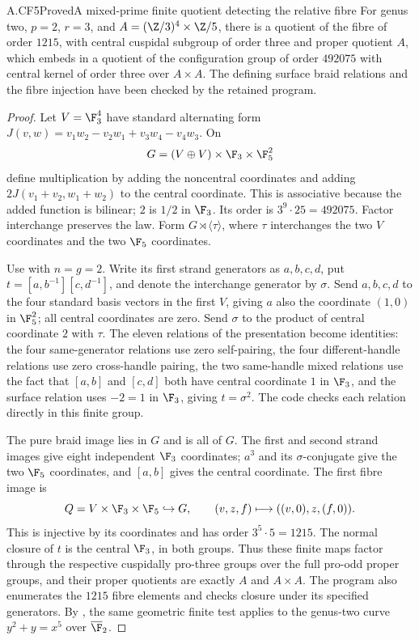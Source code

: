 \begin{claim}{A.CF5}{Proved}{A mixed-prime finite quotient detecting the relative fibre}
For genus two, $p=2$, $r=3$, and
$A=(\Z/3)^4\times\Z/5$, there is a quotient of the fibre of
order $1215$, with central cuspidal subgroup of order three and proper
quotient $A$, which embeds in a quotient of the configuration group of
order $492075$ with central kernel of order three over $A\times A$.
The defining surface braid relations and the fibre injection have been
checked by the retained program.
\end{claim}
\begin{proof}
Let $V=\F_3^4$ have standard alternating form
$J(v,w)=v_1w_2-v_2w_1+v_3w_4-v_4w_3$. On
\[
 G=(V\oplus V)\times\F_3\times\F_5^2
\]
define multiplication by adding the noncentral coordinates and adding
$2J(v_1+v_2,w_1+w_2)$ to the central coordinate. This is associative
because the added function is bilinear; $2$ is $1/2$ in $\F_3$.
Its order is $3^9\cdot25=492075$. Factor interchange preserves the
law. Form $G\rtimes\langle\tau\rangle$, where $\tau$ interchanges
the two $V$ coordinates and the two $\F_5$ coordinates.

Use \citet[Theorem 1.2]{Bellingeri2004} with $n=g=2$. Write its first
strand generators as $a,b,c,d$, put
$t=[a,b^{-1}][c,d^{-1}]$, and denote the interchange generator by
$\sigma$. Send $a,b,c,d$ to the four standard basis vectors in the
first $V$, giving $a$ also the coordinate $(1,0)$ in $\F_5^2$;
all central coordinates are zero. Send $\sigma$ to the product of
central coordinate $2$ with $\tau$. The eleven relations of the
presentation become identities: the four same-generator relations
use zero self-pairing, the four different-handle relations use zero
cross-handle pairing, the two same-handle mixed relations use the fact that
$[a,b]$ and $[c,d]$ both have central coordinate $1$ in $\F_3$,
and the surface relation
uses $-2=1$ in $\F_3$, giving $t=\sigma^2$.
The code checks each relation directly in this finite group.

The pure braid image lies in $G$ and is all of $G$. The first and
second strand images give eight independent $\F_3$ coordinates;
$a^3$ and its $\sigma$-conjugate give the two $\F_5$ coordinates,
and $[a,b]$ gives the central coordinate. The first fibre image is
\[
 Q=V\times\F_3\times\F_5\hookrightarrow G,
 \qquad (v,z,f)\longmapsto((v,0),z,(f,0)).
\]
This is injective by its coordinates and has order $3^5\cdot5=1215$.
The normal closure of $t$ is the central $\F_3$, in both groups.
Thus these finite maps factor through the respective cuspidally
pro-three groups over the full pro-odd proper groups, and their
proper quotients are exactly $A$ and $A\times A$. The program also
enumerates the $1215$ fibre elements and checks closure under its
specified generators. By , the same geometric
finite test applies to the genus-two curve $y^2+y=x^5$ over
$\overline{\F}_2$.
\end{proof}

